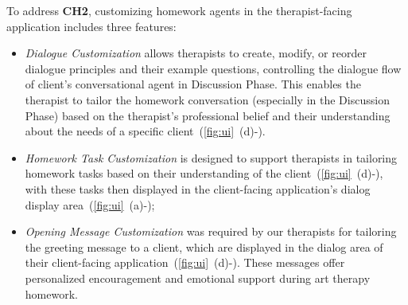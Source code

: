 To address \textbf{CH2}, customizing homework agents in the therapist-facing application includes three features:
\begin{itemize}
    \item \textit{Dialogue Customization} allows therapists to create, modify, or reorder dialogue principles and their example questions, controlling the dialogue flow of client's conversational agent in Discussion Phase. This enables the therapist to tailor the homework conversation (especially in the Discussion Phase) based on the therapist's professional belief and their understanding about the needs of a specific client~(\autoref{fig:ui}~(d)-).  
    \item \textit{Homework Task Customization} is designed to support therapists in tailoring homework tasks based on their understanding of the client~(\autoref{fig:ui}~(d)-), with these tasks then displayed in the client-facing application's dialog display area~(\autoref{fig:ui}~(a)-); 
    \item \textit{Opening Message Customization} was required by our therapists for tailoring the greeting message to a client, which are displayed in the dialog area of their client-facing application~(\autoref{fig:ui}~(d)-). These messages offer personalized encouragement and emotional support during art therapy homework.
\end{itemize}




